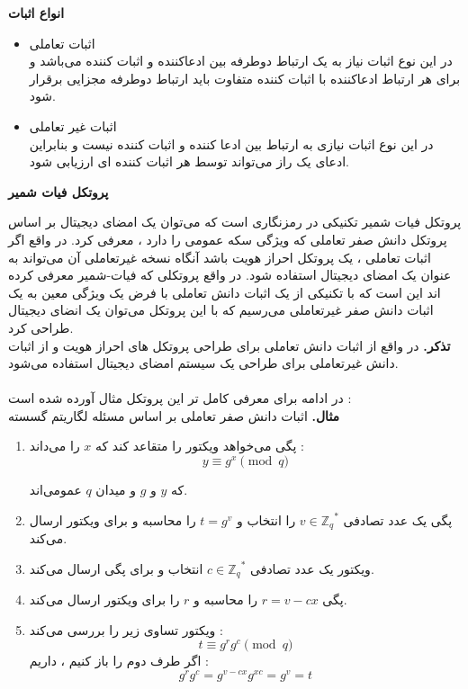 \documentclass[12pt,a4paper]{article}
\begin{document}
\newline
\textbf{انواع اثبات}
 \begin{itemize}
 	
 	\item {اثبات تعاملی}
 	\\
 	در این نوع اثبات نیاز به یک ارتباط دوطرفه بین ادعاکننده و اثبات کننده می‌باشد و برای هر ارتباط ادعاکننده با اثبات کننده متفاوت باید ارتباط دوطرفه مجزایی برقرار شود.
 	
 	\item {اثبات غیر تعاملی}
 	\\
 	در این نوع اثبات نیازی به ارتباط بین ادعا کننده و اثبات کننده نیست و بنابراین ادعای یک راز می‌تواند توسط هر اثبات کننده ای ارزیابی شود.
 	
 \end{itemize}


\textbf{پروتکل فیات شمیر}

پروتکل فیات شمیر تکنیکی در رمزنگاری است که می‌توان یک امضای دیجیتال بر اساس پروتکل دانش صفر تعاملی که ویژگی سکه عمومی
را دارد ، معرفی کرد. در واقع اگر اثبات تعاملی ، یک پروتکل احراز هویت باشد آنگاه نسخه غیرتعاملی آن می‌تواند به عنوان یک امضای دیجیتال استفاده شود. در واقع پروتکلی که فیات-شمیر معرفی کرده اند این است که با تکنیکی از یک اثبات دانش تعاملی با فرض یک ویژگی معین به یک اثبات دانش صفر غیرتعاملی می‌رسیم که با این پروتکل می‌توان یک انضای دیجیتال طراحی کرد.
\\
\textbf{تذکر.}
در واقع از اثبات دانش تعاملی برای طراحی پروتکل های احراز هویت و از اثبات دانش غیرتعاملی برای طراحی یک سیستم امضای دیجیتال استفاده می‌شود.
\\
\\
در ادامه برای معرفی کامل تر این پروتکل مثال آورده شده است :
\\
\textbf{مثال. }
اثبات دانش صفر تعاملی بر اساس مسئله لگاریتم گسسته
\\
\begin{enumerate}
	\item 
	پگی می‌خواهد ویکتور را متقاعد کند که
	$x$
	را می‌داند : 
	$$y \equiv g^x \pmod{q }$$
	 
	که 
	$y$
	و
	$g$
	و میدان 
	$q$
	عمومی‌اند.
	\item 
	پگی یک عدد تصادفی 
	$ v \in {\mathbb{Z}_q}^*$
	 را انتخاب و 
	 $t = g^v$
	 را محاسبه و برای ویکتور ارسال می‌کند.
	 \item
	 ویکتور یک عدد تصادفی 
	 $c \in {\mathbb{Z}_q}^*$
	 انتخاب و برای پگی ارسال می‌کند.
	 \item 
	 پگی
	 $r = v -cx$
	 را محاسبه و 
	 $r$
	 را برای ویکتور ارسال می‌کند.
	 \item 
	 ویکتور تساوی زیر را بررسی می‌کند :
	 $$ t \equiv g^rg^c \pmod{q }$$
	 اگر طرف دوم را باز کنیم ، داریم :
	 $$ g^rg^c = g^{v-cx}g^{xc} = g^v = t $$
	 
\end{enumerate}
\end{document}
